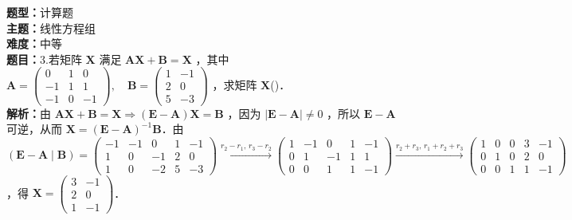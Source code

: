 \documentclass{ctexart}
\newenvironment{question}[5]{%
	\noindent\textbf{题型：}#1\\
	\textbf{主题：}#2\\
	\textbf{难度：}#3\\
	\textbf{题目：}#4\\
	\textbf{解析：}#5\\
	\vspace{1em}
}{}
\begin{document}
	\begin{question}
		{计算题}
		{线性方程组}
		{中等}
		{3.若矩阵 \(\mathbf{X}\) 满足 \(\mathbf{A X}+\mathbf{B}=\mathbf{X}\) ，其中 \(\mathbf{A}=\left(\begin{array}{ccc}0 & 1 & 0 \\ -1 & 1 & 1 \\ -1 & 0 & -1\end{array}\right),\quad \mathbf{B}=\left(\begin{array}{cc}1 & -1 \\ 2 & 0 \\ 5 & -3\end{array}\right)\) ，求矩阵 \(\mathbf{X}\)(\qquad)．}
		{由 \(\mathbf{A X}+\mathbf{B}=\mathbf{X} \Rightarrow (\mathbf{E}-\mathbf{A}) \mathbf{X}=\mathbf{B}\) ，因为 \(|\mathbf{E}-\mathbf{A}| \neq 0\) ，所以 \(\mathbf{E}-\mathbf{A}\) 可逆，从而 \(\mathbf{X}=(\mathbf{E}-\mathbf{A})^{-1} \mathbf{B}\)．由 \((\mathbf{E}-\mathbf{A} \mid \mathbf{B})=\left(\begin{array}{ccc|cc}-1 & -1 & 0 & 1 & -1 \\ 1 & 0 & -1 & 2 & 0 \\ 1 & 0 & -2 & 5 & -3\end{array}\right) \xrightarrow{r_2 - r_1,\, r_3 - r_2} \left(\begin{array}{ccc|cc}1 & -1 & 0 & 1 & -1 \\ 0 & 1 & -1 & 1 & 1 \\ 0 & 0 & 1 & 1 & -1\end{array}\right) \xrightarrow{r_2 + r_3,\, r_1 + r_2 + r_3} \left(\begin{array}{ccc|cc}1 & 0 & 0 & 3 & -1 \\ 0 & 1 & 0 & 2 & 0 \\ 0 & 0 & 1 & 1 & -1\end{array}\right)\) ，得 \(\mathbf{X}=\left(\begin{array}{cc}3 & -1 \\ 2 & 0 \\ 1 & -1\end{array}\right)\)．}
	\end{question}
	
\end{document}
